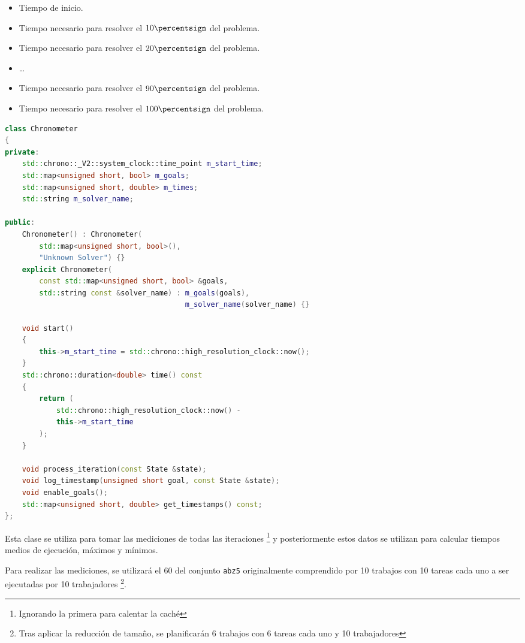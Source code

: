 \begin{itemize}[itemsep=0.25px]
    \item Tiempo de inicio.
    \item Tiempo necesario para resolver el $10\percentsign$ del problema.
    \item Tiempo necesario para resolver el $20\percentsign$ del problema.
    \item \dots
    \item Tiempo necesario para resolver el $90\percentsign$ del problema.
    \item Tiempo necesario para resolver el $100\percentsign$ del problema.
\end{itemize}

\begin{lstlisting}[language=C++]
class Chronometer
{
private:
    std::chrono::_V2::system_clock::time_point m_start_time;
    std::map<unsigned short, bool> m_goals;
    std::map<unsigned short, double> m_times;
    std::string m_solver_name;

public:
    Chronometer() : Chronometer(
        std::map<unsigned short, bool>(),
        "Unknown Solver") {}
    explicit Chronometer(
        const std::map<unsigned short, bool> &goals,
        std::string const &solver_name) : m_goals(goals),
                                          m_solver_name(solver_name) {}

    void start()
    {
        this->m_start_time = std::chrono::high_resolution_clock::now();
    }
    std::chrono::duration<double> time() const
    {
        return (
            std::chrono::high_resolution_clock::now() -
            this->m_start_time
        );
    }

    void process_iteration(const State &state);
    void log_timestamp(unsigned short goal, const State &state);
    void enable_goals();
    std::map<unsigned short, double> get_timestamps() const;
};
\end{lstlisting}

Esta clase se utiliza para tomar las mediciones de todas las iteraciones
\footnote{Ignorando la primera para calentar la caché}
y posteriormente estos datos se utilizan para calcular tiempos medios de ejecución,
máximos y mínimos.

Para realizar las mediciones, se utilizará el 60\percentsign{}
del conjunto \lstinline{abz5} originalmente comprendido por
10 trabajos con 10 tareas cada uno a ser ejecutadas por 10 trabajadores
\footnote{Tras aplicar la reducción de tamaño, se planificarán 6 trabajos
con 6 tareas cada uno y 10 trabajadores}.

